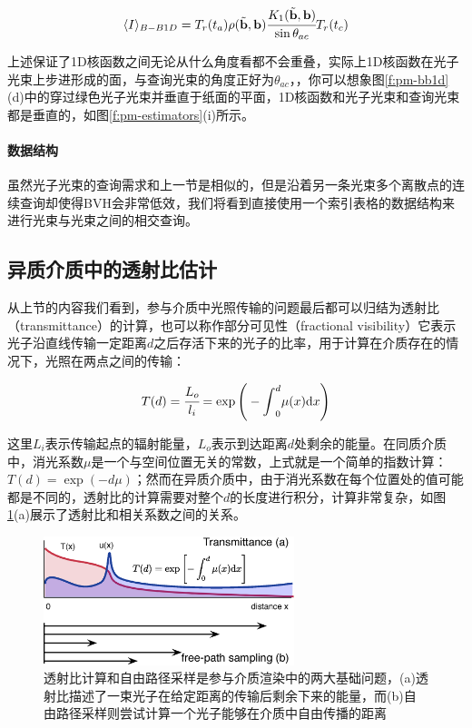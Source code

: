 \begin{equation}\label{e:pm-bb1d}
	\langle I\rangle_{B-B1D}=T_r(t_a) \rho(\tilde{\mathbf{b}},\mathbf{b}) \cfrac{K_1(\tilde{\mathbf{b}},\mathbf{b})}{\sin{\theta_{ac}}}T_r(t_c)
\end{equation}

上述保证了1D核函数之间无论从什么角度看都不会重叠，实际上1D核函数在光子光束上步进形成的面，与查询光束的角度正好为$\theta_{ac}$，，你可以想象图\ref{f:pm-bb1d}(d)中的穿过绿色光子光束并垂直于纸面的平面，1D核函数和光子光束和查询光束都是垂直的，如图\ref{f:pm-estimators}(i)所示。




\paragraph{数据结构}
虽然光子光束的查询需求和上一节是相似的，但是沿着另一条光束多个离散点的连续查询却使得BVH会非常低效，我们将看到\cite{a:UnifyingPointsBeamsandPathsinVolumetricLightTransportSimulation}直接使用一个索引表格的数据结构来进行光束与光束之间的相交查询。






\subsection{异质介质中的透射比估计}
从上节的内容我们看到，参与介质中光照传输的问题最后都可以归结为透射比（transmittance）的计算，也可以称作部分可见性（fractional visibility）它表示光子沿直线传输一定距离$d$之后存活下来的光子的比率，用于计算在介质存在的情况下，光照在两点之间的传输：

\begin{equation}
	T(d)= \cfrac{L_o}{l_i}=\exp{\Bigg(-{\rm \int}^{d}_0}\mu(x){\rm d}x\Bigg)
\end{equation}

这里$L_i$表示传输起点的辐射能量，$L_o$表示到达距离$d$处剩余的能量。在同质介质中，消光系数$\mu$是一个与空间位置无关的常数，上式就是一个简单的指数计算：$T(d)=\exp(-d\mu)$；然而在异质介质中，由于消光系数在每个位置处的值可能都是不同的，透射比的计算需要对整个$d$的长度进行积分，计算非常复杂，如图\ref{f:pm-transmittance-vs-fps}(a)展示了透射比和相关系数之间的关系。

\begin{figure}
	\sidecaption
	\includegraphics[width=0.65\textwidth]{figures/pm/transmittance-1}
	\caption{透射比计算和自由路径采样是参与介质渲染中的两大基础问题，(a)透射比描述了一束光子在给定距离的传输后剩余下来的能量，而(b)自由路径采样则尝试计算一个光子能够在介质中自由传播的距离}
	\label{f:pm-transmittance-vs-fps}
\end{figure}


